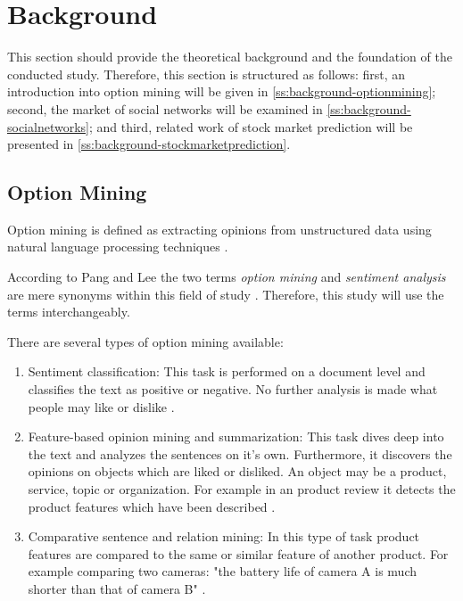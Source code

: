 \section{Background} 
\label{s:background}

This section should provide the theoretical background and the foundation of the conducted study.
Therefore, this section is structured as follows: 
first, an introduction into option mining will be given in \autoref{ss:background-optionmining};
second, the market of social networks will be examined in \autoref{ss:background-socialnetworks};
and third, related work of stock market prediction will be presented in \autoref{ss:background-stockmarketprediction}.

\subsection{Option Mining} 
\label{ss:background-optionmining}

Option mining is defined as extracting opinions from unstructured data using natural language processing techniques \cite[page 411]{Liu2007}.

According to Pang and Lee the two terms \emph{option mining} and \emph{sentiment analysis} are mere synonyms within this field of study \cite{Pang2008c}.
Therefore, this study will use the terms interchangeably.

There are several types of option mining available:

\begin{enumerate}
	\item 
	Sentiment classification: 
	This task is performed on a document level and classifies the text as positive or negative. 
	No further analysis is made what people may like or dislike 
	\cite[page 411]{Liu2007}.
	
	\item 
	Feature-based opinion mining and summarization: 
	This task dives deep into the text and analyzes the sentences on it's own.
	Furthermore, it discovers the opinions on objects which are liked or disliked.
	An object may be a product, service, topic or organization. 
	For example in an product review it detects the product features which have been described 
	\cite[page 412]{Liu2007}.
	
	\item
	Comparative sentence and relation mining:
	In this type of task product features are compared to the same or similar feature of another product.
	For example comparing two cameras: "the battery life of camera A is much shorter than that of camera B" 
	\cite[page 412]{Liu2007}. 
\end{enumerate}


